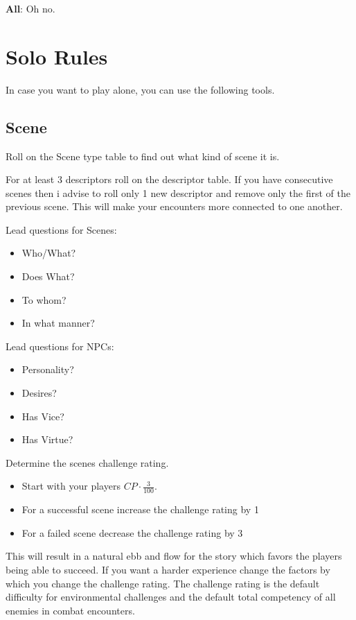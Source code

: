 \documentclass[11pt]{article}
\begin{document}
{\textbf{All}: Oh no.


\newpage
\section{Solo Rules}
\label{sec:orgc69c70b}
In case you want to play alone, you can use the following tools.
\subsection{Scene}
\label{sec:org56b67ea}
Roll on the Scene type table to find out what kind of scene it is.

For at least 3 descriptors roll on the descriptor table. If you have consecutive scenes then i advise to roll only 1 new descriptor and remove only the first of the previous scene. This will make your encounters more connected to one another.

\begin{multicols}{2}
Lead questions for Scenes: 
\begin{itemize}
\item Who/What?
\item Does What?
\item To whom?
\item In what manner?
\end{itemize}
\columnbreak
Lead questions for NPCs:
\begin{itemize}
\item Personality?
\item Desires?
\item Has Vice?
\item Has Virtue?
\end{itemize}
\end{multicols}

Determine the scenes challenge rating.
\begin{itemize}
\item Start with your players \(CP \cdot \frac{3}{100}\).
\item For a successful scene increase the challenge rating by 1
\item For a failed scene decrease the challenge rating by 3
\end{itemize}

This will result in a natural ebb and flow for the story which favors the players being able to succeed. If you want a harder experience change the factors by which you change the challenge rating. 
The challenge rating is the default difficulty for environmental challenges and the default total competency of all enemies in combat encounters.

}
\end{document}
